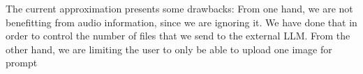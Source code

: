 \documentclass[12pt]{article}
\begin{document}
The current approximation presents some drawbacks: From one hand, we are not benefitting from audio information, since we are ignoring it. We have done that in order to control the number of files that we send to the external LLM. From the other hand, we are limiting the user to only be able to upload one image for prompt  
\end{document}
